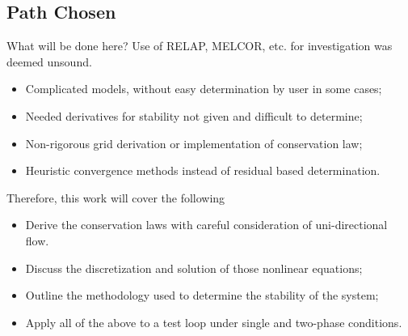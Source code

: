     
    
    
    
    \subsection*{Path Chosen}
    \begin{frame}{What will be done here?}
        Use of RELAP, MELCOR, etc. for investigation was deemed unsound.
        \begin{itemize}
            \item Complicated models, without easy determination by user in some cases;
            \item Needed derivatives for stability not given and difficult to determine;
            \item Non-rigorous grid derivation or implementation of conservation law;
            \item Heuristic convergence methods instead of residual based determination.
        \end{itemize}
        
        Therefore, this work will cover the following
        \begin{itemize}
            \item Derive the conservation laws with careful consideration of uni-directional flow.
            \item Discuss the discretization and solution of those nonlinear equations;
            \item Outline the methodology used to determine the stability of the system;
            \item Apply all of the above to a test loop under single and two-phase conditions.
        \end{itemize}
    \end{frame}






